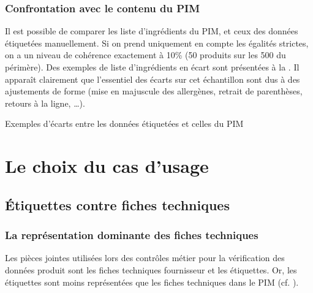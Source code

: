             \subsection{Confrontation avec le contenu du PIM}
            \label{ingredient_comparison}
            Il est possible de comparer les liste d'ingrédients du PIM, et ceux des données étiquetées manuellement.
            Si on prend uniquement en compte les égalités strictes, on a un niveau de cohérence exactement à 10\% (50 produits sur les 500 du périmère).
            Des exemples de liste d'ingrédients en écart sont présentées à la .
            Il apparaît clairement que l'essentiel des écarts sur cet échantillon sont dus à des ajustements de forme (mise en majuscule des allergènes, retrait de parenthèses, retours à la ligne, \dots).

            {\renewcommand{\arraystretch}{1.5}%
            \begin{table}[htbp]
                \begin{center}
                {\scriptsize
                
                }
                \caption{Exemples d'écarts entre les données étiquetées et celles du PIM}
                \label{tbl:ingredient_comparison}
                \end{center}
            \end{table}
            }

    \chapter{Le choix du cas d'usage}

        \section{\'{E}tiquettes contre fiches techniques}

            \subsection{La représentation dominante des fiches techniques}
            
            Les pièces jointes utilisées lors des contrôles métier pour la vérification des données produit sont les fiches techniques fournisseur et les étiquettes.
            Or, les étiquettes sont moins représentées que les fiches techniques dans le PIM (cf. ).
            
